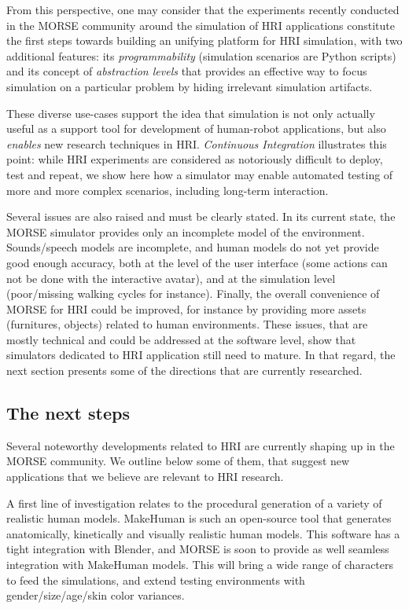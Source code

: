\documentclass{llncs}
\begin{document}
From this perspective, one may consider that the experiments recently conducted
in the MORSE community around the simulation of HRI applications constitute the
first steps towards building an unifying platform for HRI simulation, with two
additional features: its \emph{programmability} (simulation scenarios are Python
scripts) and its concept of \emph{abstraction levels} that provides an effective
way to focus simulation on a particular problem by hiding irrelevant simulation
artifacts.

These diverse use-cases support the idea that simulation is not only actually
useful as a support tool for development of human-robot applications, but also
\emph{enables} new research techniques in HRI. \emph{Continuous Integration}
illustrates this point: while HRI experiments are considered as notoriously
difficult to deploy, test and repeat, we show here how a simulator may enable
automated testing of more and more complex scenarios, including long-term
interaction.

Several issues are also raised and must be clearly stated. In its current state,
the MORSE simulator provides only an incomplete model of the environment.
Sounds/speech models are incomplete, and human models do not yet provide good
enough accuracy, both at the level of the user interface (some actions can not
be done with the interactive avatar), and at the simulation level (poor/missing
walking cycles for instance). Finally, the overall convenience of MORSE for HRI
could be improved, for instance by providing more assets (furnitures, objects)
related to human environments. These issues, that are mostly technical and could
be addressed at the software level, show that simulators dedicated to HRI
application still need to mature. In that regard, the next section presents some
of the directions that are currently researched.

\subsection*{The next steps}

Several noteworthy developments related to HRI are currently shaping up in the
MORSE community. We outline below some of them, that suggest new applications
that we believe are relevant to HRI research.

A first line of investigation relates to the procedural generation of a variety
of realistic human models. {\sc MakeHuman} is such an open-source tool that
generates anatomically, kinetically and visually realistic human models. This
software has a tight integration with Blender, and MORSE is soon to provide as
well seamless integration with {\sc MakeHuman} models. This will bring a wide
range of characters to feed the simulations, and extend testing environments
with gender/size/age/skin color variances.
\end{document}
